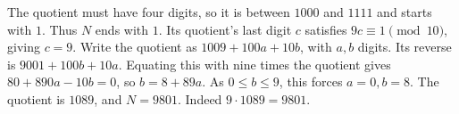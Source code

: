 The quotient must have four digits, so it is between $1000$ and $1111$ and starts with $1$. Thus $N$ ends with $1$. Its quotient's last digit $c$ satisfies $9c\equiv1\pmod{10}$, giving $c=9$. Write the quotient as $1009+100a+10b$, with $a,b$ digits. Its reverse is $9001+100b+10a$. Equating this with nine times the quotient gives $80+890a-10b=0$, so $b=8+89a$. As $0\le b\le9$, this forces $a=0,b=8$. The quotient is $1089$, and $N=\boxed{9801}$. Indeed $9\cdot1089=9801$.
